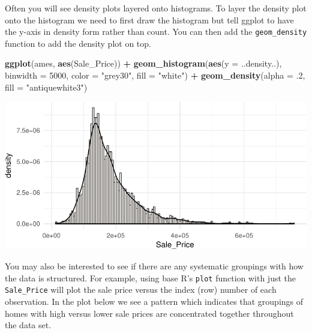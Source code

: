 \documentclass[]{article}
\newenvironment{Shaded}{\begin{snugshade}}{\end{snugshade}}
\newcommand{\KeywordTok}[1]{\textcolor[rgb]{0.13,0.29,0.53}{\textbf{#1}}}
\newcommand{\DataTypeTok}[1]{\textcolor[rgb]{0.13,0.29,0.53}{#1}}
\newcommand{\DecValTok}[1]{\textcolor[rgb]{0.00,0.00,0.81}{#1}}
\newcommand{\StringTok}[1]{\textcolor[rgb]{0.31,0.60,0.02}{#1}}
\newcommand{\OperatorTok}[1]{\textcolor[rgb]{0.81,0.36,0.00}{\textbf{#1}}}
\newcommand{\NormalTok}[1]{#1}
\begin{document}
Often you will see density plots layered onto histograms. To layer the
density plot onto the histogram we need to first draw the histogram but
tell ggplot to have the y-axis in density form rather than count. You
can then add the \texttt{geom\_density} function to add the density plot
on top.

\begin{Shaded}
\begin{Highlighting}[]
\KeywordTok{ggplot}\NormalTok{(ames, }\KeywordTok{aes}\NormalTok{(Sale_Price)) }\OperatorTok{+}
\StringTok{  }\KeywordTok{geom_histogram}\NormalTok{(}\KeywordTok{aes}\NormalTok{(}\DataTypeTok{y =}\NormalTok{ ..density..),}
                 \DataTypeTok{binwidth =} \DecValTok{5000}\NormalTok{, }\DataTypeTok{color =} \StringTok{"grey30"}\NormalTok{, }\DataTypeTok{fill =} \StringTok{"white"}\NormalTok{) }\OperatorTok{+}
\StringTok{  }\KeywordTok{geom_density}\NormalTok{(}\DataTypeTok{alpha =}\NormalTok{ .}\DecValTok{2}\NormalTok{, }\DataTypeTok{fill =} \StringTok{"antiquewhite3"}\NormalTok{)}
\end{Highlighting}
\end{Shaded}

\begin{center}\includegraphics{Chapter_3_-_Visualization_files/figure-latex/density2-1} \end{center}

You may also be interested to see if there are any systematic groupings
with how the data is structured. For example, using base R's
\texttt{plot} function with just the \texttt{Sale\_Price} will plot the
sale price versus the index (row) number of each observation. In the
plot below we see a pattern which indicates that groupings of homes with
high versus lower sale prices are concentrated together throughout the
data set.

\begin{Shaded}
\end{Shaded}
\end{document}
